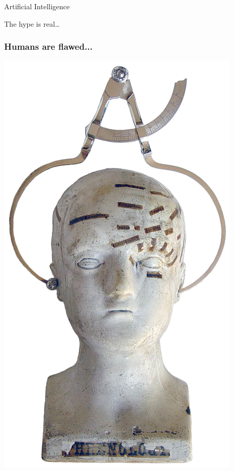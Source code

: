 \documentclass[aspectratio=169,x11names]{beamer}
\begin{document}


\begin{frame}
\begin{center}
\huge
Artificial Intelligence\bigskip

\large
The hype is real\dots
\end{center}
\end{frame}

\begin{frame}
\frametitle{Humans are flawed...}
\begin{minipage}{0.5\textwidth}
\begin{center}
\includegraphics[keepaspectratio, height=0.75\textheight]{images/calipers_transparent}

\end{center}
\end{minipage}
\end{frame}
\end{document}
